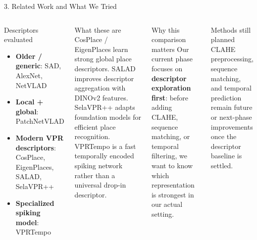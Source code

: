 \documentclass[aspectratio=169,10pt]{beamer}
\begin{document}
\begin{frame}{3. Related Work and What We Tried}
  \begin{columns}[T,totalwidth=\textwidth]
      \begin{block}{Descriptors evaluated}
        \small
        \begin{itemize}
          \item \textbf{Older / generic}: SAD, AlexNet, NetVLAD
          \item \textbf{Local + global}: PatchNetVLAD
          \item \textbf{Modern VPR descriptors}: CosPlace, EigenPlaces, SALAD, SelaVPR++
          \item \textbf{Specialized spiking model}: VPRTempo
        \end{itemize}
      \end{block}

      \begin{block}{What these are}
        \small
        CosPlace / EigenPlaces learn strong global place descriptors. SALAD improves descriptor aggregation with DINOv2 features. SelaVPR++ adapts foundation models for efficient place recognition. VPRTempo is a fast temporally encoded spiking network rather than a universal drop-in descriptor.
      \end{block}

      \begin{block}{Why this comparison matters}
        \small
        Our current phase focuses on \textbf{descriptor exploration first}: before adding CLAHE, sequence matching, or temporal filtering, we want to know which representation is strongest in our actual setting.
      \end{block}

      \begin{block}{Methods still planned}
        \small
        CLAHE preprocessing, sequence matching, and temporal prediction remain future or next-phase improvements once the descriptor baseline is settled.
      \end{block}
  \end{columns}
\end{frame}
\end{document}
